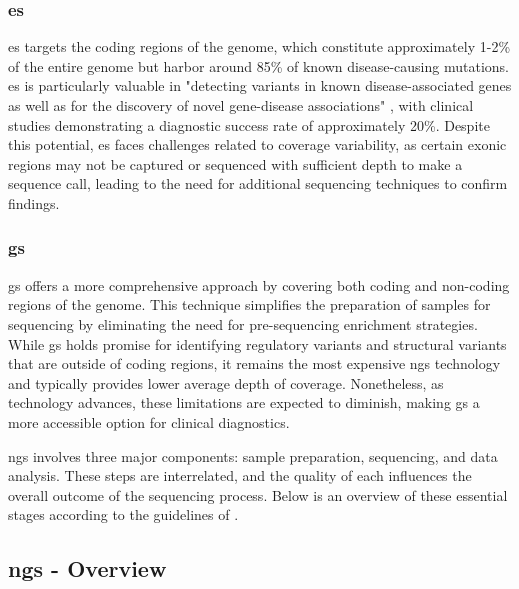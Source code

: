 \subsubsection{\textbf{\acl{es}}} \label{subsubsubsec:ngs_es}

\acl{es} targets the coding regions of the genome, which constitute approximately 1-2\% of the entire genome but harbor around 85\% of known disease-causing mutations. \cite{Majewski580} \ac{es} is particularly valuable in "detecting variants in known disease-associated genes as well as for the discovery of novel gene-disease associations" \cite{Rehm2013}, with clinical studies demonstrating a diagnostic success rate of approximately 20\%. \cite{schork_genetic_2013} Despite this potential, \ac{es} faces challenges related to coverage variability, as certain exonic regions may not be captured or sequenced with sufficient depth to make a sequence call, leading to the need for additional sequencing techniques to confirm findings. \cite{Rehm2013}

\subsubsection{\textbf{\acl{gs}}} \label{subsubsubsec:ngs_gs}

\acl{gs} offers a more comprehensive approach by covering both coding and non-coding regions of the genome. This technique simplifies the preparation of samples for sequencing by eliminating the need for pre-sequencing enrichment strategies. While \ac{gs} holds promise for identifying regulatory variants and structural variants that are outside of coding regions, it remains the most expensive \ac{ngs} technology and typically provides lower average depth of coverage. Nonetheless, as technology advances, these limitations are expected to diminish, making \ac{gs} a more accessible option for clinical diagnostics. \cite{Rehm2013}

\ac{ngs} involves three major components: sample preparation, sequencing, and data analysis. These steps are interrelated, and the quality of each influences the overall outcome of the sequencing process. Below is an overview of these essential stages according to the guidelines of \cite{Rehm2013}.

\subsection{\acl{ngs} - Overview} \label{subsec:ngs_overview}

